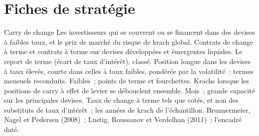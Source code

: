 \begin{omfigure}

\label{fig:s1:carry-across-asset-classes:wti}
\end{omfigure}

\section{Fiches de stratégie}

\begin{strategyfile}{Carry de change}\label{strat:s1:carry-across-asset-classes:fx}
 Les investisseurs qui se couvrent ou se financent dans des devises à faibles taux, et le prix de marché du risque de krach global.
 Contrats de change à terme et contrats à terme sur devises développées et émergentes liquides.
 Le report de terme (écart de taux d'intérêt), classé.
 Position longue dans les devises à taux élevés, courte dans celles à taux faibles, pondérée par la volatilité~; termes mensuels reconduits.
 Faibles~; points de terme et fourchettes.
 Krachs lorsque les positions de carry à effet de levier se débouclent ensemble.
 Mois~; grande capacité sur les principales devises.
 Taux de change à terme tels que cotés, et non des substituts de taux d'intérêt~; les années de krach de l'échantillon.
 Brunnermeier, Nagel et Pedersen (2008)~; Lustig, Roussanov et Verdelhan (2011)~; l'encadré daté.
\end{strategyfile}

